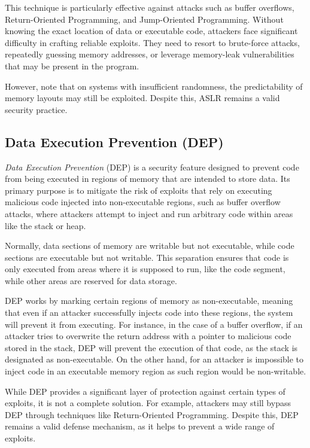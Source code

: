This technique is particularly effective against attacks such as buffer
overflows, Return-Oriented Programming, and Jump-Oriented Programming. Without knowing
the exact location of data or executable code, attackers face significant
difficulty in crafting reliable exploits. They need to resort to brute-force attacks,
repeatedly guessing memory addresses, or leverage memory-leak vulnerabilities that
may be present in the program.

However, note that on systems with insufficient randomness, the predictability of
memory layouts may still be exploited. Despite this, ASLR remains a valid security
practice.

\subsection{Data Execution Prevention (DEP)}
\label{subsec:background_dep}

\textit{Data Execution Prevention} (DEP) is a security feature designed to prevent
code from being executed in regions of memory that are intended to store data.
Its primary purpose is to mitigate the risk of exploits that rely on executing
malicious code injected into non-executable regions, such as buffer overflow attacks,
where attackers attempt to inject and run arbitrary code within areas like the
stack or heap.

Normally, data sections of memory are writable but not executable, while code
sections are executable but not writable. This separation ensures that code is only
executed from areas where it is supposed to run, like the code segment, while other
areas are reserved for data storage.

DEP works by marking certain regions of memory as non-executable, meaning that
even if an attacker successfully injects code into these regions, the system will
prevent it from executing. For instance, in the case of a buffer overflow, if an
attacker tries to overwrite the return address with a pointer to malicious code
stored in the stack, DEP will prevent the execution of that code, as the stack
is designated as non-executable. On the other hand, for an attacker is
impossible to inject code in an executable memory region as such region would be
non-writable.

While DEP provides a significant layer of protection against certain types of
exploits, it is not a complete solution. For example, attackers may still bypass
DEP through techniques like Return-Oriented Programming. Despite this, DEP remains
a valid defense mechanism, as it helps to prevent a wide range of exploits.

